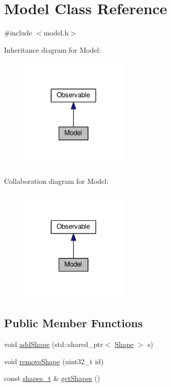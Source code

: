 \hypertarget{class_model}{\section{Model Class Reference}
\label{class_model}
}


{\ttfamily \#include $<$model.\-h$>$}



Inheritance diagram for Model\-:
\nopagebreak
\begin{figure}[H]
\begin{center}
\leavevmode
\includegraphics[width=146pt]{class_model__inherit__graph}
\end{center}
\end{figure}


Collaboration diagram for Model\-:
\nopagebreak
\begin{figure}[H]
\begin{center}
\leavevmode
\includegraphics[width=146pt]{class_model__coll__graph}
\end{center}
\end{figure}
\subsection*{Public Member Functions}
\begin{DoxyCompactItemize}
\item 
void \hyperlink{class_model_a3484c3b12fd36cfad3a747da1f7836a6}{add\-Shape} (std\-::shared\-\_\-ptr$<$ \hyperlink{class_shape}{Shape} $>$ s)
\item 
void \hyperlink{class_model_ad606d11bbdc31559c1c31e42c739deb8}{remove\-Shape} (uint32\-\_\-t id)
\item 
const \hyperlink{model_8h_a20f87b4e5f8cd3bd25dffa8e90e1340c}{shapes\-\_\-t} \& \hyperlink{class_model_aefac93c7d48c75209a496e24fa67b1b7}{get\-Shapes} ()
\end{DoxyCompactItemize}


